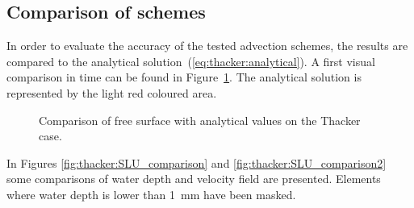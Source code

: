 \subsection{Comparison of schemes}

In order to evaluate the accuracy of the tested advection schemes, the results
are compared to the analytical solution~(\ref{eq:thacker:analytical}).
A first visual comparison in time can be found in Figure~\ref{fig:thacker:SLTime}.
The analytical solution is represented by the light red coloured area.

\begin{figure}[H]
\begin{minipage}[t]{0.5\textwidth}
 \centering
\end{minipage}
\begin{minipage}[t]{0.5\textwidth}
 \centering
\end{minipage}
\begin{minipage}[t]{0.5\textwidth}
 \centering
\end{minipage}
\begin{minipage}[t]{0.5\textwidth}
 \centering
\end{minipage}
  \caption{Comparison of free surface with analytical values on the Thacker case.}
  \label{fig:thacker:SLTime}
\end{figure}

In Figures \ref{fig:thacker:SLU_comparison} and \ref{fig:thacker:SLU_comparison2}
some comparisons of water depth and velocity field are presented.
Elements where water depth is lower than 1~mm have been masked.


